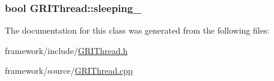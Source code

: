 \hypertarget{classGRIThread_a0cba5383e1e8e8e43642da07eb469f36}{
\subsubsection[{sleeping\-\_\-}]{\setlength{\rightskip}{0pt plus 5cm}bool {\bf \-G\-R\-I\-Thread\-::sleeping\-\_\-}}}\label{classGRIThread_a0cba5383e1e8e8e43642da07eb469f36}


\-The documentation for this class was generated from the following files\-:\begin{DoxyCompactItemize}
\item 
framework/include/\hyperlink{GRIThread_8h}{\-G\-R\-I\-Thread.\-h}\item 
framework/source/\hyperlink{GRIThread_8cpp}{\-G\-R\-I\-Thread.\-cpp}\end{DoxyCompactItemize}
